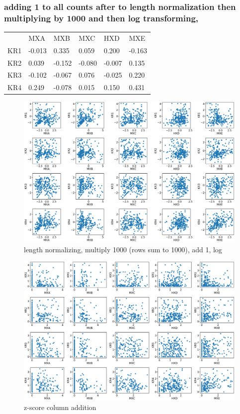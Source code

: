 \subsubsection{adding 1 to all counts after to length normalization then multiplying by 1000 and then log transforming,}

\begin{table}[h!]
\begin{tabular}{llllll}
&MXA & MXB                   & MXC                  & HXD                  & MXE                                        \\
KR1 & -0.013 & 0.335  & 0.059  & 0.200  & -0.163 \\
KR2 & 0.039   & -0.152 & -0.080  & -0.007 & 0.135  \\
KR3 & -0.102   & -0.067 & 0.076  & -0.025 & 0.220   \\
KR4 & 0.249   & -0.078 & 0.015 & 0.150  & 0.431 
\end{tabular}
\end{table}

\begin{figure}[h]
\centering
\includegraphics[width=\textwidth]{images/9_figs.pdf}
\caption{ length normalizing, multiply 1000 (rows sum to 1000), add 1, log}
\label{fig:9plots}
\end{figure}

\begin{figure}[h]
\centering
\includegraphics[width=\textwidth]{images/2_figs.pdf}
\caption{z-score column addition}
\label{fig:2plots}
\end{figure}
